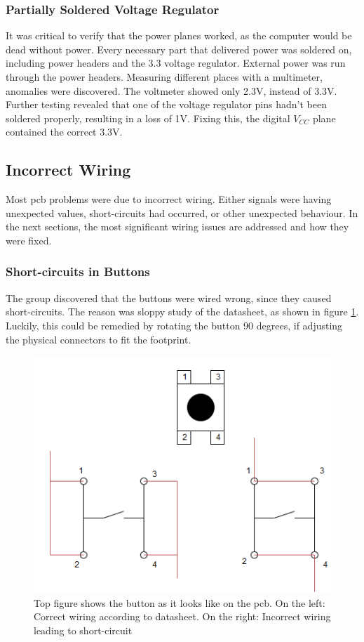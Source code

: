 \subsubsection{Partially Soldered Voltage Regulator} 
It was critical to verify that the power planes worked, as the computer would be dead without power.
Every necessary part that delivered power was soldered on, including power headers and the 3.3 voltage regulator. 
External power was run through the power headers. 
Measuring different places with a multimeter, anomalies were discovered. 
The voltmeter showed only 2.3V, instead of 3.3V. 
Further testing revealed that one of the voltage regulator pins hadn't been soldered properly, resulting in a loss of 1V. 
Fixing this, the digital \(V_{CC}\) plane contained the correct 3.3V.

\subsection{Incorrect Wiring}
Most \gls{pcb} problems were due to incorrect wiring. 
Either signals were having unexpected values, short-circuits had occurred, or other unexpected behaviour. 
In the next sections, the most significant wiring issues are addressed and how they were fixed.

\subsubsection{Short-circuits in Buttons}
The group discovered that the buttons were wired wrong, since they caused short-circuits. 
The reason was sloppy study of the datasheet, as shown in figure \ref{fig:Button Issue}. 
Luckily, this could be remedied by rotating the button 90 degrees, if adjusting the physical connectors to fit the footprint.

\begin{figure}[h!]
\centering
\includegraphics[scale=0.5]{images/Button_Issue.png}
\caption{Top figure shows the button as it looks like on the \gls{pcb}. On the left: Correct wiring according to datasheet. On the right: Incorrect wiring leading to short-circuit}
\label{fig:Button Issue}
\end{figure}

